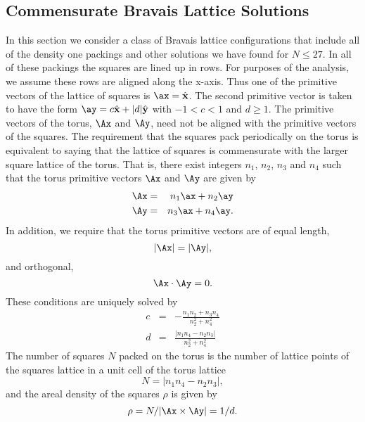 \subsection{Commensurate Bravais Lattice Solutions}
In this section we consider a class of Bravais lattice configurations that include all of the density one packings and other solutions we have found for  $N \leq 27$.   In all of these packings the squares are lined up in rows.  For purposes of the analysis, we assume these rows are aligned along the x-axis. Thus one of the primitive vectors of the lattice of squares is $\ax=\hat{{\bf x}}$.   The second primitive vector is taken to have the form $\ay=c \hat{{\bf x}} + |d| \hat{{\bf y}}$ with $-1< c <1$ and  $d\geq 1$.  The primitive vectors of the torus, $\Ax$ and $\Ay$, need not be aligned with the primitive vectors of the squares.     The requirement that the squares pack periodically on the torus is equivalent to saying that the lattice of squares is commensurate with the larger square lattice of the torus.  That is, there exist  integers $n_1$, $n_2$, $n_3$ and $n_4$ such that the torus primitive vectors $\Ax$ and $\Ay$ are given by
\begin{eqnarray} 
\label{eqn:Ana}
\Ax&=& n_1 \ax + n_2 \ay \nonumber \\ 
\Ay&=&n_3 \ax + n_4 \ay.
\end{eqnarray}
In addition, we require that the torus primitive vectors are of equal length,
\begin{equation}
\label{eqn:normal}
|\Ax|=|\Ay| ,
\end{equation}
and orthogonal,
\begin{equation}
\label{eqn:ortho}
\Ax \cdot \Ay = 0 .
\end{equation}
These conditions are uniquely solved by
\begin{eqnarray}\label{eq:gap}
c &=& - \frac{n_1 n_2 + n_3 n_4}{n_2^2 + n_4^2}\\
d &=& \frac{| n_1 n_4 - n_2 n_3|}{n_2^2 + n_4^2} \nonumber
\end{eqnarray}
The number of squares $N$ packed on the torus is the number of lattice points of the squares lattice in a unit cell of the torus lattice
\begin{equation}
\label{eqn:N}
N = |n_1 n_4 - n_2 n_3|,
\end{equation}
and the areal density of the squares $\rho$ is given by
\begin{equation}
\label{ }
\rho=N/|\Ax \times \Ay| = 1/d.
\end{equation}

